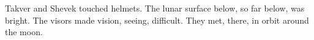 

Takver and Shevek touched helmets.  The lunar surface below, so far
below, was bright.  The visors made vision, seeing, difficult.  They
met, there, in orbit around the moon.

\bye
